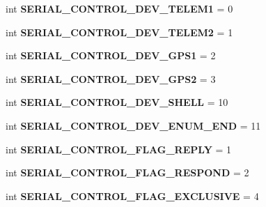 \begin{DoxyCompactItemize}
int {\bfseries S\+E\+R\+I\+A\+L\+\_\+\+C\+O\+N\+T\+R\+O\+L\+\_\+\+D\+E\+V\+\_\+\+T\+E\+L\+E\+M1} = 0
\item 
\mbox{\label{namespacepymavlink_1_1dialects_1_1v10_a8af873370adcdda283576bd246556f31}} 
int {\bfseries S\+E\+R\+I\+A\+L\+\_\+\+C\+O\+N\+T\+R\+O\+L\+\_\+\+D\+E\+V\+\_\+\+T\+E\+L\+E\+M2} = 1
\item 
\mbox{\label{namespacepymavlink_1_1dialects_1_1v10_a0e2e5c0a041fafb909afc6b65740e113}} 
int {\bfseries S\+E\+R\+I\+A\+L\+\_\+\+C\+O\+N\+T\+R\+O\+L\+\_\+\+D\+E\+V\+\_\+\+G\+P\+S1} = 2
\item 
\mbox{\label{namespacepymavlink_1_1dialects_1_1v10_ab1578cc73b96a7011d75242cedbcb0ab}} 
int {\bfseries S\+E\+R\+I\+A\+L\+\_\+\+C\+O\+N\+T\+R\+O\+L\+\_\+\+D\+E\+V\+\_\+\+G\+P\+S2} = 3
\item 
\mbox{\label{namespacepymavlink_1_1dialects_1_1v10_aebab65fef5fff5b95a444b0c740f6dd8}} 
int {\bfseries S\+E\+R\+I\+A\+L\+\_\+\+C\+O\+N\+T\+R\+O\+L\+\_\+\+D\+E\+V\+\_\+\+S\+H\+E\+LL} = 10
\item 
\mbox{\label{namespacepymavlink_1_1dialects_1_1v10_aa4c9005735b36b226fb8098a34500063}} 
int {\bfseries S\+E\+R\+I\+A\+L\+\_\+\+C\+O\+N\+T\+R\+O\+L\+\_\+\+D\+E\+V\+\_\+\+E\+N\+U\+M\+\_\+\+E\+ND} = 11
\item 
\mbox{\label{namespacepymavlink_1_1dialects_1_1v10_a790ddda0cb5367705c605a9d65f27444}} 
int {\bfseries S\+E\+R\+I\+A\+L\+\_\+\+C\+O\+N\+T\+R\+O\+L\+\_\+\+F\+L\+A\+G\+\_\+\+R\+E\+P\+LY} = 1
\item 
\mbox{\label{namespacepymavlink_1_1dialects_1_1v10_ab927804c880407369c6b76614f159f11}} 
int {\bfseries S\+E\+R\+I\+A\+L\+\_\+\+C\+O\+N\+T\+R\+O\+L\+\_\+\+F\+L\+A\+G\+\_\+\+R\+E\+S\+P\+O\+ND} = 2
\item 
\mbox{\label{namespacepymavlink_1_1dialects_1_1v10_ada037f09f62b76c09e5f7f179e292b95}} 
int {\bfseries S\+E\+R\+I\+A\+L\+\_\+\+C\+O\+N\+T\+R\+O\+L\+\_\+\+F\+L\+A\+G\+\_\+\+E\+X\+C\+L\+U\+S\+I\+VE} = 4

\end{DoxyCompactItemize}
